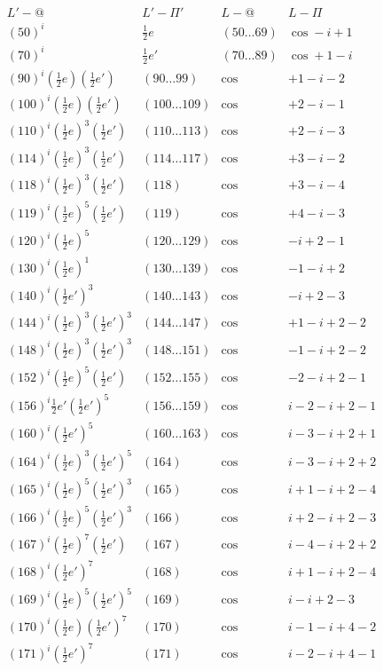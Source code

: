 \documentclass[11pt,a4paper]{article}
\theoremstyle{plain}
\theoremstyle{definition}
\theoremstyle{remark}
\begin{document}
\[
\begin{array}{cccc}
L'-@ & L'-\Pi' & L-@ & L-\Pi \\
(50)^{i} & \tfrac12 e & (50\dots69) & \cos -i+1 \\
(70)^{i} & \tfrac12 e' & (70\dots89) & \cos +1-i \\
(90)^{i}(\tfrac12 e)(\tfrac12 e') & (90\dots99) & \cos & +1-i-2 \\
(100)^{i}(\tfrac12 e)(\tfrac12 e') & (100\dots109) & \cos & +2-i-1 \\
(110)^{i}(\tfrac12 e)^{3}(\tfrac12 e') & (110\dots113) & \cos & +2-i-3 \\
(114)^{i}(\tfrac12 e)^{3}(\tfrac12 e') & (114\dots117) & \cos & +3-i-2 \\
(118)^{i}(\tfrac12 e)^{3}(\tfrac12 e') & (118) & \cos & +3-i-4 \\
(119)^{i}(\tfrac12 e)^{5}(\tfrac12 e') & (119) & \cos & +4-i-3 \\
(120)^{i}(\tfrac12 e)^{5} & (120\dots129) & \cos & -i+2-1 \\
(130)^{i}(\tfrac12 e)^{1} & (130\dots139) & \cos & -1-i+2 \\
(140)^{i}(\tfrac12 e')^{3} & (140\dots143) & \cos & -i+2-3 \\
(144)^{i}(\tfrac12 e)^{3}(\tfrac12 e')^{3} & (144\dots147) & \cos & +1-i+2-2 \\
(148)^{i}(\tfrac12 e)^{3}(\tfrac12 e')^{3} & (148\dots151) & \cos & -1-i+2-2 \\
(152)^{i}(\tfrac12 e)^{5}(\tfrac12 e') & (152\dots155) & \cos & -2-i+2-1 \\
(156)^{i}\tfrac12 e'(\tfrac12 e')^{5} & (156\dots159) & \cos & i-2-i+2-1 \\
(160)^{i}(\tfrac12 e')^{5} & (160\dots163) & \cos & i-3-i+2+1 \\
(164)^{i}(\tfrac12 e)^{3}(\tfrac12 e')^{5} & (164) & \cos & i-3-i+2+2 \\
(165)^{i}(\tfrac12 e)^{5}(\tfrac12 e')^{3} & (165) & \cos & i+1-i+2-4 \\
(166)^{i}(\tfrac12 e)^{5}(\tfrac12 e')^{3} & (166) & \cos & i+2-i+2-3 \\
(167)^{i}(\tfrac12 e)^{7}(\tfrac12 e') & (167) & \cos & i-4-i+2+2 \\
(168)^{i}(\tfrac12 e')^{7} & (168) & \cos & i+1-i+2-4 \\
(169)^{i}(\tfrac12 e)^{5}(\tfrac12 e')^{5} & (169) & \cos & i-i+2-3 \\
(170)^{i}(\tfrac12 e)(\tfrac12 e')^{7} & (170) & \cos & i-1-i+4-2 \\
(171)^{i}(\tfrac12 e')^{7} & (171) & \cos & i-2-i+4-1 \\
\end{array}
\]
\end{document}
